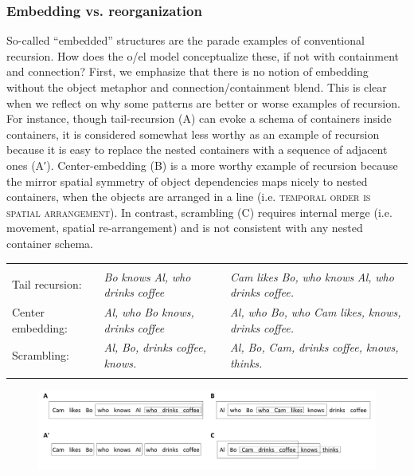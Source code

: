 \subsubsection{Embedding vs. reorganization}

So-called “embedded” structures are the parade examples of conventional recursion. How does the o/el model conceptualize these, if not with containment and connection? First, we emphasize that there is no notion of embedding without the object metaphor and connection/containment blend. This is clear when we reflect on why some patterns are better or worse examples of recursion. For instance, though tail-recursion (A) can evoke a schema of containers inside containers, it is considered somewhat less worthy as an example of recursion because it is easy to replace the nested containers with a sequence of adjacent ones (A′). Center-embedding (B) is a more worthy example of recursion because the mirror spatial symmetry of object dependencies maps nicely to nested containers, when the objects are arranged in a line (i.e. \textsc{temporal} \textsc{order} \textsc{is} \textsc{spatial} \textsc{arrangement}). In contrast, scrambling (C) requires internal merge (i.e. movement, spatial re-arrangement) and is not consistent with any nested container schema.

\begin{tabularx}{\textwidth}{XXX} &  & \\
\lsptoprule
Tail recursion: & \textit{Bo} \textit{knows} \textit{Al,} \textit{who} \textit{drinks} \textit{coffee} & \textit{Cam} \textit{likes} \textit{Bo,} \textit{who} \textit{knows} \textit{Al,} \textit{who} \textit{drinks} \textit{coffee.}\\
Center embedding: & \textit{Al,} \textit{who} \textit{Bo} \textit{knows,} \textit{drinks} \textit{coffee} & \textit{Al,} \textit{who} \textit{Bo,} \textit{who} \textit{Cam} \textit{likes,} \textit{knows,} \textit{drinks} \textit{coffee.}\\
Scrambling: & \textit{Al,} \textit{Bo,} \textit{drinks} \textit{coffee,} \textit{knows.} & \textit{Al,} \textit{Bo,} \textit{Cam,} \textit{drinks} \textit{coffee,} \textit{knows,} \textit{thinks.}\\
\lspbottomrule
\end{tabularx}
  
\begin{figure}
\includegraphics[width=\textwidth]{figures/Tilsen-img118.png}
\caption{\missingcaption}
\label{fig:}
\end{figure}
 


